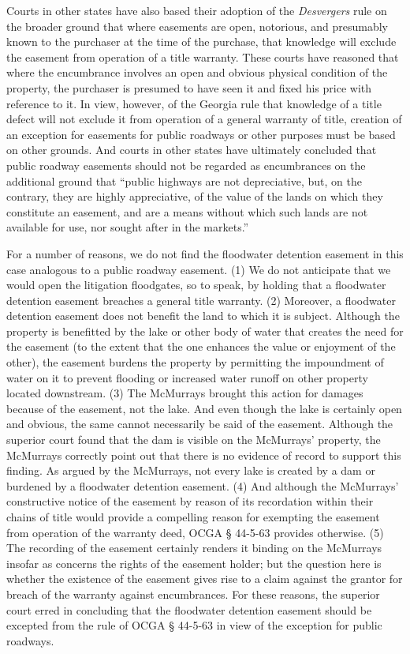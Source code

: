 Courts in other states have also based their adoption of the \textit{Desvergers
}rule on the broader ground that where easements are open, notorious, and
presumably known to the purchaser at the time of the purchase, that knowledge
will exclude the easement from operation of a title warranty. These courts have
reasoned that where the encumbrance involves an open and obvious physical
condition of the property, the purchaser is presumed to have seen it and fixed
his price with reference to it. In view, however, of the Georgia rule that
knowledge of a title defect will not exclude it from operation of a general
warranty of title, creation of an exception for easements for public roadways
or other purposes must be based on other grounds. And courts in other states
have ultimately concluded that public roadway easements should not be regarded
as encumbrances on the additional ground that ``public highways are not
depreciative, but, on the contrary, they are highly appreciative, of the value
of the lands on which they constitute an easement, and are a means without
which such lands are not available for use, nor sought after in the markets.'' 

For a number of reasons, we do not find the floodwater detention easement in
this case analogous to a public roadway easement. (1) We do not anticipate that
we would open the litigation floodgates, so to speak, by holding that a
floodwater detention easement breaches a general title warranty. (2) Moreover,
a floodwater detention easement does not benefit the land to which it is
subject. Although the property is benefitted by the lake or other body of water
that creates the need for the easement (to the extent that the one enhances the
value or enjoyment of the other), the easement burdens the property by
permitting the impoundment of water on it to prevent flooding or increased
water runoff on other property located downstream. (3) The McMurrays brought
this action for damages because of the easement, not the lake. And even though
the lake is certainly open and obvious, the same cannot necessarily be said of
the easement. Although the superior court found that the dam is visible on the
McMurrays' property, the McMurrays correctly point out that there is no
evidence of record to support this finding. As argued by the McMurrays, not
every lake is created by a dam or burdened by a floodwater detention easement.
(4) And although the McMurrays' constructive notice of the easement by reason
of its recordation within their chains of title would provide a compelling
reason for exempting the easement from operation of the warranty deed, OCGA
{\S} 44-5-63 provides otherwise. (5) The recording of the easement certainly
renders it binding on the McMurrays insofar as concerns the rights of the
easement holder; but the question here is whether the existence of the easement
gives rise to a claim against the grantor for breach of the warranty against
encumbrances. For these reasons, the superior court erred in concluding that
the floodwater detention easement should be excepted from the rule of OCGA {\S}
44-5-63 in view of the exception for public roadways. 

